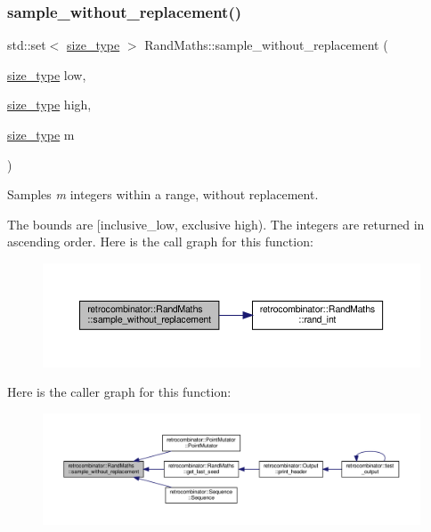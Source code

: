 \subsubsection{\texorpdfstring{sample\+\_\+without\+\_\+replacement()}{sample\_without\_replacement()}}
{\footnotesize\ttfamily std\+::set$<$ \hyperlink{constants_8h_a8e1541b50cee66a791df4c437ccbb385}{size\+\_\+type} $>$ Rand\+Maths\+::sample\+\_\+without\+\_\+replacement (\begin{DoxyParamCaption}\item[{\hyperlink{constants_8h_a8e1541b50cee66a791df4c437ccbb385}{size\+\_\+type}}]{low,  }\item[{\hyperlink{constants_8h_a8e1541b50cee66a791df4c437ccbb385}{size\+\_\+type}}]{high,  }\item[{\hyperlink{constants_8h_a8e1541b50cee66a791df4c437ccbb385}{size\+\_\+type}}]{m }\end{DoxyParamCaption})}



Samples {\itshape m} integers within a range, without replacement. 

The bounds are \mbox{[}inclusive\+\_\+low, exclusive high). The integers are returned in ascending order. Here is the call graph for this function\+:
\nopagebreak
\begin{figure}[H]
\begin{center}
\leavevmode
\includegraphics[width=350pt]{classretrocombinator_1_1RandMaths_a6a7fe159f46afec51d997e4d07d2cfe6_cgraph}
\end{center}
\end{figure}
Here is the caller graph for this function\+:
\nopagebreak
\begin{figure}[H]
\begin{center}
\leavevmode
\includegraphics[width=350pt]{classretrocombinator_1_1RandMaths_a6a7fe159f46afec51d997e4d07d2cfe6_icgraph}
\end{center}
\end{figure}
\mbox{\label{classretrocombinator_1_1RandMaths_a2b61e31de6067ffa35531d5bde40f4c6}} 
